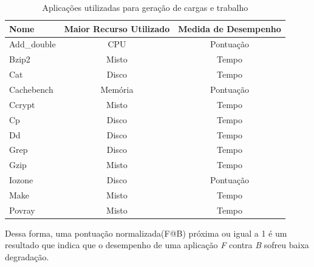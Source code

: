 \begin{table}[H]
\centering
\caption{Aplicações utilizadas para geração de cargas e trabalho}
\label{table-aplications}
\begin{tabular}{|l|c|c|}
\hline
Nome        & \multicolumn{1}{l|}{Maior Recurso Utilizado} & \multicolumn{1}{l|}{Medida de Desempenho} \\ \hline
Add\_double & CPU                                          & Pontuação                                  \\ \hline
Bzip2       & Misto                                        & Tempo                                      \\ \hline
Cat         & Disco                                        & Tempo                                      \\ \hline
Cachebench  & Memória                                      & Pontuação                                  \\ \hline
Ccrypt      & Misto                                        & Tempo                                      \\ \hline
Cp          & Disco                                        & Tempo                                      \\ \hline
Dd          & Disco                                        & Tempo                                      \\ \hline
Grep        & Disco                                        & Tempo                                      \\ \hline
Gzip        & Misto                                        & Tempo                                      \\ \hline
Iozone      & Disco                                        & Pontuação                                  \\ \hline
Make        & Misto                                        & Tempo                                      \\ \hline
Povray      & Misto                                        & Tempo                                      \\ \hline
\end{tabular}
\end{table}

Dessa forma, uma pontuação normalizada(F@B) próxima ou igual a 1 é um resultado que indica que o desempenho de uma aplicação \textit{F} contra \textit{B} sofreu baixa degradação.

